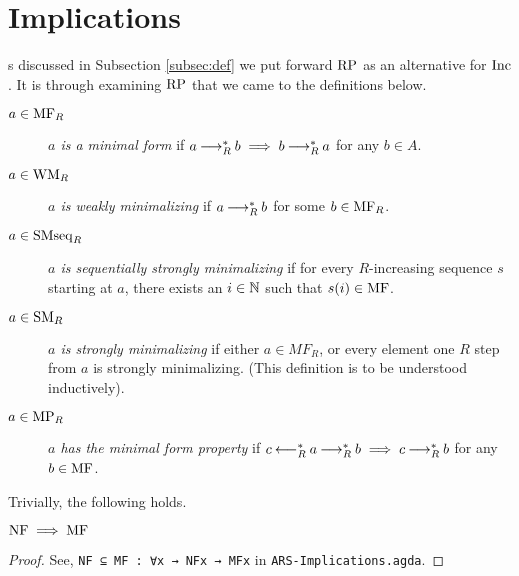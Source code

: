\section{Implications}
\label{sec:Implications}

\newenvironment{counterexample}[1][]{%
    \refstepcounter{CEcounter} %
    \noindent \scriptsize\textbf{{\theCEcounter } }  #1\par
}

As discussed in Subsection \ref{subsec:def} we put forward $\mathrm{RP}$ as an alternative for $\mathrm{Inc}$. It is through examining $\mathrm{RP}$ that 
we came to the definitions below. 

\begin{definition}\label{def:mf} \hfill
    \begin{description}
        \item[$a \in \mathrm{MF}_R$] \emph{$a$ is a minimal form} if $a \mathbin{\longrightarrow_R^*} b \implies b \mathbin{\longrightarrow_R^*} a$ for any $b \in A$.
        \item[$a \in \mathrm{WM}_R$] \emph{$a$ is weakly minimalizing} if $a \mathbin{\longrightarrow_R^*} b$ for some $b \in \mathrm{MF}_R$.
        \item[$a \in \mathrm{SMseq}_R$] \emph{$a$ is sequentially strongly minimalizing} if for every $R$-increasing sequence $s$ starting at $a$, there exists 
        an $i \in \mathbb{N}$ such that $s (i) \in \mathrm{MF}$. 
        \item[$a \in \mathrm{SM}_R$]  \emph{$a$ is strongly minimalizing} if either $a \in MF_R$, or every element one $R$ step from $a$ is strongly minimalizing. (This 
        definition is to be understood inductively).
        \item[$a \in \mathrm{MP}_R$] \emph{$a$ has the minimal form property} if $c \mathbin{\longleftarrow_R^*} a \mathbin{\longrightarrow_R^*} b \implies c \mathbin{\longrightarrow_R^*} b$ for any $b \in \mathrm{MF}$.

    \end{description} 
\end{definition}

Trivially, the following holds. 
\begin{proposition}\label{prop:nftomf}
    $\mathrm{NF} \implies \mathrm{MF}$ 
\end{proposition}    
\begin{proof}
    See, \verb|NF ⊆ MF : ∀x → NFx → MFx| in \texttt{ARS-Implications.agda}.
\end{proof}

